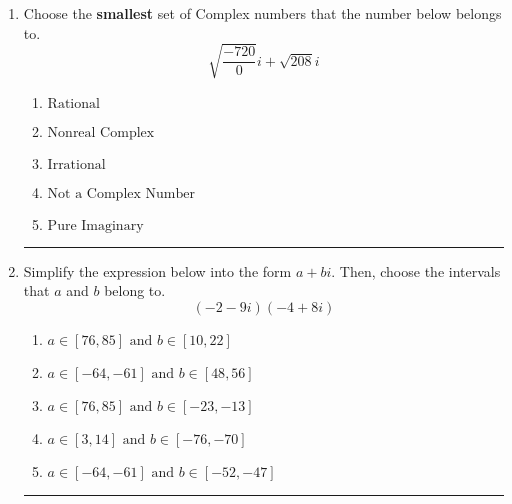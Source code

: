 \documentclass[14pt]{extbook}
\newcommand{\litem}[1]{\item#1\hspace*{-1cm}\rule{\textwidth}{0.4pt}}
\begin{document}
\begin{enumerate}
{\begin{enumerate}[label=\Alph*.]
\end{enumerate} }
\litem{
Choose the \textbf{smallest} set of Complex numbers that the number below belongs to.\[ \sqrt{\frac{-720}{0}} i+\sqrt{208}i \]\begin{enumerate}[label=\Alph*.]
\item \( \text{Rational} \)
\item \( \text{Nonreal Complex} \)
\item \( \text{Irrational} \)
\item \( \text{Not a Complex Number} \)
\item \( \text{Pure Imaginary} \)

\end{enumerate} }
\litem{
Simplify the expression below into the form $a+bi$. Then, choose the intervals that $a$ and $b$ belong to.\[ (-2 - 9 i)(-4 + 8 i) \]\begin{enumerate}[label=\Alph*.]
\item \( a \in [76, 85] \text{ and } b \in [10, 22] \)
\item \( a \in [-64, -61] \text{ and } b \in [48, 56] \)
\item \( a \in [76, 85] \text{ and } b \in [-23, -13] \)
\item \( a \in [3, 14] \text{ and } b \in [-76, -70] \)
\item \( a \in [-64, -61] \text{ and } b \in [-52, -47] \)

\end{enumerate} }
\end{enumerate}
\end{document}

